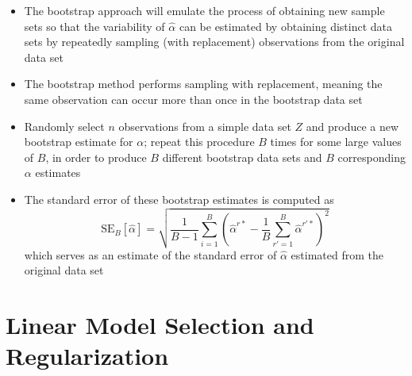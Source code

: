 \documentclass[12pt]{article}
\begin{document}
\begin{itemize}
\item The bootstrap approach will emulate the process of obtaining new sample sets so that the variability of $\hat{\alpha}$ can be estimated by obtaining distinct data sets by repeatedly sampling (with replacement) observations from the original data set 
\item The bootstrap method performs sampling with replacement, meaning the same observation can occur more than once in the bootstrap data set 
\item Randomly select $n$ observations from a simple data set $Z$ and produce a new bootstrap estimate for $\alpha$; repeat this procedure $B$ times for some large values of $B$, in order to produce $B$ different bootstrap data sets and $B$ corresponding $\alpha$ estimates 
\item The standard error of these bootstrap estimates is computed as 
$$ \text{SE}_B[\hat{\alpha}] = \sqrt{\frac{1}{B-1} \sum_{i=1}^B \left( \hat{\alpha}^{r*} - \frac{1}{B}\sum_{r' = 1}^B \hat{\alpha}^{r'*} \right)^2} $$ which serves as an estimate of the standard error of $\hat{\alpha}$ estimated from the original data set 
\end{itemize}

\section{Linear Model Selection and Regularization}
\end{document}
